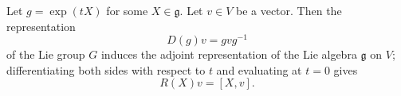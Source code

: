 \begin{leftbar}
  \begin{remark}
    Let $g = \exp(t X)$ for some $X \in \mathfrak{g}$. Let $v \in V$ be a vector. Then the representation
    \begin{equation}
      D(g) v = g v g^{-1}
    \end{equation}
    of the Lie group $G$ induces the adjoint representation of the Lie algebra $\mathfrak{g}$ on $V$; differentiating both sides with respect to $t$ and evaluating at $t = 0$ gives
    \begin{equation}
      R(X) v = [X, v].
    \end{equation}
  \end{remark}
\end{leftbar}

